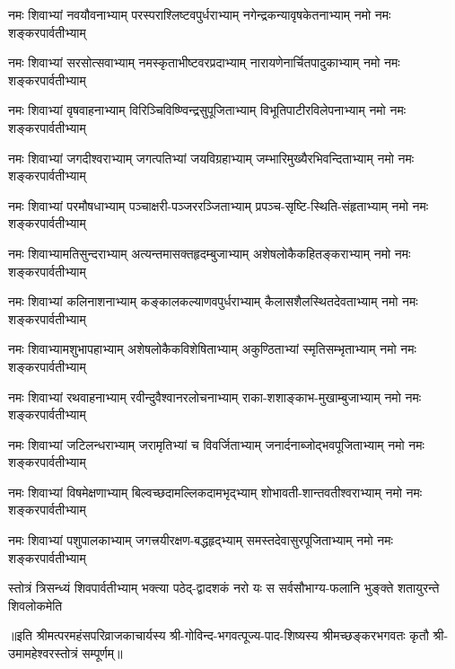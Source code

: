 
\begin{AutoCols}[\maxColumns]
\fourlineindentedshloka
{नमः शिवाभ्यां नवयौवनाभ्याम्‌}
{परस्पराश्लिष्टवपुर्धराभ्याम्‌}
{नगेन्द्रकन्यावृषकेतनाभ्याम्‌}
{नमो नमः शङ्करपार्वतीभ्याम्‌}%

\fourlineindentedshloka
{नमः शिवाभ्यां सरसोत्सवाभ्याम्‌}
{नमस्कृताभीष्टवरप्रदाभ्याम्‌}
{नारायणेनार्चितपादुकाभ्याम्}
{नमो नमः शङ्करपार्वतीभ्याम्‌}%

\fourlineindentedshloka
{नमः शिवाभ्यां वृषवाहनाभ्याम्‌}
{विरिञ्चिविष्ण्विन्द्रसुपूजिताभ्याम्‌}
{विभूतिपाटीरविलेपनाभ्याम्‌}
{नमो नमः शङ्करपार्वतीभ्याम्‌}%

\fourlineindentedshloka
{नमः शिवाभ्यां जगदीश्वराभ्याम्}
{जगत्पतिभ्यां जयविग्रहाभ्याम्‌}
{जम्भारिमुख्यैरभिवन्दिताभ्याम्‌}
{नमो नमः शङ्करपार्वतीभ्याम्‌}%

\fourlineindentedshloka
{नमः शिवाभ्यां परमौषधाभ्याम्‌}
{पञ्चाक्षरी-पञ्जररञ्जिताभ्याम्‌}
{प्रपञ्च-सृष्टि-स्थिति-संहृताभ्याम्‌}
{नमो नमः शङ्करपार्वतीभ्याम्‌}%

\fourlineindentedshloka
{नमः शिवाभ्यामतिसुन्दराभ्याम्‌}
{अत्यन्तमासक्तहृदम्बुजाभ्याम्‌}
{अशेषलोकैकहितङ्कराभ्याम्‌}
{नमो नमः शङ्करपार्वतीभ्याम्‌}%

\fourlineindentedshloka
{नमः शिवाभ्यां कलिनाशनाभ्याम्‌}
{कङ्कालकल्याणवपुर्धराभ्याम्‌}
{कैलासशैलस्थितदेवताभ्याम्‌}
{नमो नमः शङ्करपार्वतीभ्याम्‌}%

\fourlineindentedshloka
{नमः शिवाभ्यामशुभापहाभ्याम्‌}
{अशेषलोकैकविशेषिताभ्याम्‌}
{अकुण्ठिताभ्यां स्मृतिसम्भृताभ्याम्‌}
{नमो नमः शङ्करपार्वतीभ्याम्‌}%

\fourlineindentedshloka
{नमः शिवाभ्यां रथवाहनाभ्याम्‌}
{रवीन्दुवैश्वानरलोचनाभ्याम्‌}
{राका-शशाङ्काभ-मुखाम्बुजाभ्याम्‌}
{नमो नमः शङ्करपार्वतीभ्याम्‌}%

\fourlineindentedshloka
{नमः शिवाभ्यां जटिलन्धराभ्याम्‌}
{जरामृतिभ्यां च विवर्जिताभ्याम्‌}
{जनार्दनाब्जोद्भवपूजिताभ्याम्‌}
{नमो नमः शङ्करपार्वतीभ्याम्‌}%

\fourlineindentedshloka
{नमः शिवाभ्यां विषमेक्षणाभ्याम्‌}
{बिल्वच्छदामल्लिकदामभृद्‌भ्याम्‌}
{शोभावती-शान्तवतीश्वराभ्याम्‌}
{नमो नमः शङ्करपार्वतीभ्याम्‌}%

\fourlineindentedshloka
{नमः शिवाभ्यां पशुपालकाभ्याम्‌}
{जगत्त्रयीरक्षण-बद्धहृद्‌भ्याम्‌}
{समस्तदेवासुरपूजिताभ्याम्‌}
{नमो नमः शङ्करपार्वतीभ्याम्‌}%

\fourlineindentedshloka
{स्तोत्रं त्रिसन्ध्यं शिवपार्वतीभ्याम्‌}
{भक्त्या पठेद्-द्वादशकं नरो यः}
{स सर्वसौभाग्य-फलानि भुङ्क्ते}
{शतायुरन्ते शिवलोकमेति}%

{॥इति श्रीमत्परमहंसपरिव्राजकाचार्यस्य श्री-गोविन्द-भगवत्पूज्य-पाद-शिष्यस्य 
श्रीमच्छङ्करभगवतः कृतौ श्री-उमामहेश्वरस्तोत्रं सम्पूर्णम्‌॥}

\end{AutoCols}  
